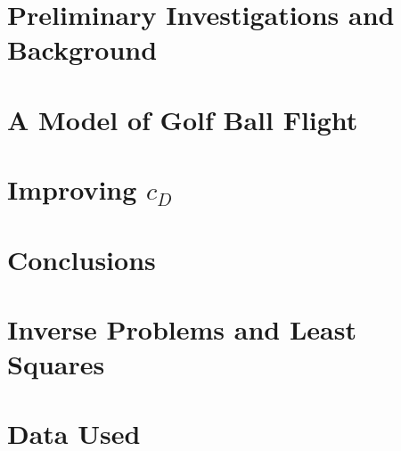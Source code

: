 \documentclass[12pt,MSc,twoside]{muthesis}
\numberwithin{equation}{section}
\begin{document}
\chapter{Preliminary Investigations and Background}


\chapter{A Model of Golf Ball Flight}


\chapter{Improving $c_{D}$}


\chapter{Conclusions}



\appendix
\chapter{Inverse Problems and Least Squares}


\chapter{Data Used}




\end{document}
